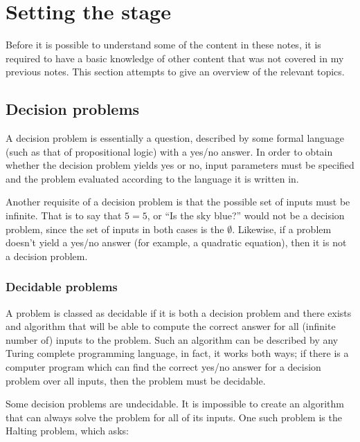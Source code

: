 
\section{Setting the stage}

Before it is possible to understand some of the content in these notes, it is
required to have a basic knowledge of other content that was not covered in my
previous notes. This section attempts to give an overview of the relevant
topics.

\subsection{Decision problems}

A decision problem is essentially a question, described by some formal language
(such as that of propositional logic) with a yes/no answer. In order to obtain
whether the decision problem yields yes or no, input parameters must be
specified and the problem evaluated according to the language it is written in.

Another requisite of a decision problem is that the possible set of inputs must
be infinite. That is to say that $5 = 5$, or ``Is the sky blue?'' would not be a
decision problem, since the set of inputs in both cases is the $\emptyset$.
Likewise, if a problem doesn't yield a yes/no answer (for example, a quadratic
equation), then it is not a decision problem.

\subsubsection{Decidable problems}

A problem is classed as decidable if it is both a decision problem and there
exists and algorithm that will be able to compute the correct answer for all
(infinite number of) inputs to the problem. Such an algorithm can be described
by any Turing complete programming language, in fact, it works both ways; if
there is a computer program which can find the correct yes/no answer for a
decision problem over all inputs, then the problem must be decidable.

Some decision problems are undecidable. It is impossible to create an algorithm
that can always solve the problem for all of its inputs. One such problem is the
Halting problem, which asks:

